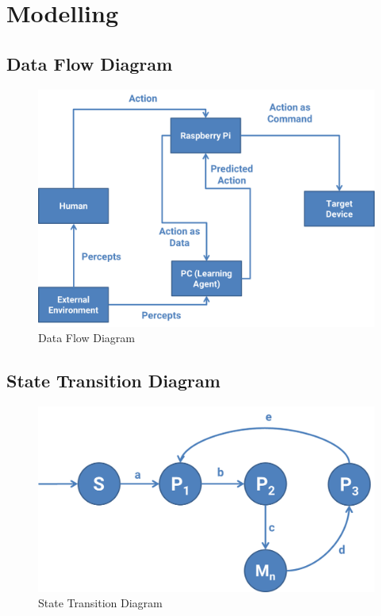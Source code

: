 \chapter{Modelling}


\section{Data Flow Diagram}

\begin{figure}[h]
	\includegraphics[width=\textwidth]{./Chapter4/dfd}
		\caption{Data Flow Diagram}
\end{figure}

\section{State Transition Diagram}

\begin{figure}[h]
	\includegraphics[width=\textwidth]{./Chapter4/state-transition}
		\caption{State Transition Diagram}
\end{figure}

